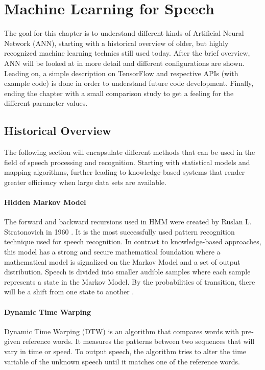 \chapter{Machine Learning for Speech}\label{ch:machine_learning}
The goal for this chapter is to understand different kinds of Artificial Neural Network (ANN), starting with a historical overview of older, but highly recognized machine learning technics still used today. After the brief overview, ANN will be looked at in more detail and different configurations are shown. Leading on, a simple description on TensorFlow and respective APIs (with example code) is done in order to understand future code development. Finally, ending the chapter with a small comparison study to get a feeling for the different parameter values.

\section{Historical Overview}
The following section will encapsulate different methods that 
can be used in the field of speech processing and recognition.
Starting with statistical models and mapping algorithms,
further leading to knowledge-based systems that render greater
efficiency when large data sets are available.

\subsubsection{Hidden Markov Model}

The forward and backward recursions used in HMM  were
created by Ruslan L. Stratonovich in 1960
\cite{stratonovich1960conditional}.
It is the most successfully used pattern recognition technique used for speech recognition.
In contrast to knowledge-based approaches, this model has
a strong and secure mathematical foundation
where a mathematical model is signalized on the Markov
Model and a set of output distribution. Speech is divided
into smaller audible samples where each sample represents a state in the Markov Model. 
By the probabilities of transition, there will be a shift from one state to another
\cite[p.~2]{gaikwad2010review}\cite{togneri1990speech}.

\subsubsection{Dynamic Time Warping}

Dynamic Time Warping (DTW) is an algorithm that compares words with pre-given reference words.
It measures the patterns between two sequences that will vary in time or speed.\cite{togneri1990speech}
To output speech, the algorithm tries to alter the time variable of the unknown speech until it matches one of the reference words.
